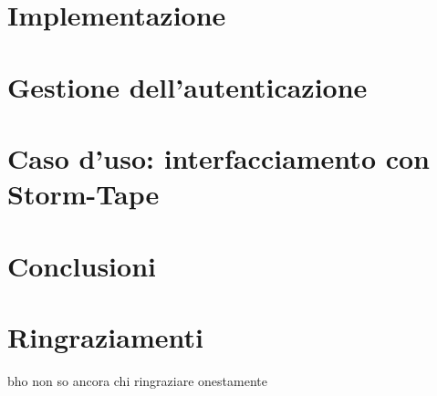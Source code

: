 \documentclass[12pt,a4paper,openright,twoside]{report}
\begin{document}
\chapter{Implementazione}
\lhead[\fancyplain{}{\bfseries\thepage}]{\fancyplain{}{\bfseries\rightmark}}


\chapter{Gestione dell'autenticazione}
\lhead[\fancyplain{}{\bfseries\thepage}]{\fancyplain{}{\bfseries\rightmark}}


\chapter{Caso d'uso: interfacciamento con Storm-Tape}
\lhead[\fancyplain{}{\bfseries\thepage}]{\fancyplain{}{\bfseries\rightmark}}


\chapter{Conclusioni}
\lhead[\fancyplain{}{\bfseries\thepage}]{\fancyplain{}{\bfseries\rightmark}}




\chapter*{Ringraziamenti}
bho non so ancora chi ringraziare onestamente
\end{document}
